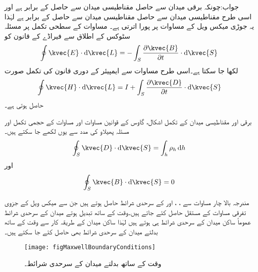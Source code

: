 جواب:چونکہ برقی میدان سے حاصل  مقناطیسی میدان سے حاصل  کے برابر ہے اور اسی طرح مقناطیسی میدان سے حاصل   مقناطیسی میدان سے حاصل  کے برابر ہے لہٰذا یہ جوڑی میکس ویل کے مساوات پر پورا اترتی ہے۔
 مساوات  کے سطحی تکمل پر مسئلہ سٹوکس کے اطلاق سے فیراڈے کے  قانون کو
\begin{align}\label{مساوات_میکس_ویل_تکمل_مساوات_الف}
\oint \kvec{E} \cdot \dif \kvec{L}=-\int_S \frac{\partial \kvec{B}}{\partial t} \cdot \dif \kvec{S}
\end{align}
لکھا جا سکتا ہے۔اسی طرح مساوات  سے ایمپیئر کے دوری قانون کی تکمل صورت
\begin{align}\label{مساوات_میکس_ویل_تکمل_مساوات_ب}
\oint \kvec{H} \cdot \dif \kvec{L}=I+\int_S \frac{\partial \kvec{D}}{\partial t} \cdot \dif \kvec{S}
\end{align}
حاصل ہوتی ہے۔

برقی اور مقناطیسی میدان کے تکمل اشکال، گاوس کے قوانین مساوات  اور مساوات  کے حجمی تکمل اور مسئلہ پھیلاو کی مدد سے یوں لکھے جا سکتے ہیں۔ 
\begin{align}\label{مساوات_میکس_ویل_تکمل_مساوات_پ}
\oint_S \kvec{D} \cdot \dif \kvec{S}=\int_h \rho_h \dif h
\end{align}
اور
\begin{align}\label{مساوات_میکس_ویل_تکمل_مساوات_ت}
\oint_S \kvec{B} \cdot \dif \kvec{S}=0
\end{align}

مندرجہ بالا چار مساوات سے ، ،  اور  کے سرحدی شرائط حاصل ہوتے ہیں جن سے میکس ویل کے جزوی تفرقی مساوات کے مستقل حاصل کئے جاتے ہیں۔وقت کے ساتھ تبدیل ہوتے میدان کے سرحدی شرائط عموماً ساکن میدان کے سرحدی شرائط ہی ہوتے ہیں لہٰذا ساکن میدان کے طریقہ کار سے وقت کے ساتھ بدلتے میدان کے سرحدی شرائط بھی حاصل کئے جا سکتے ہیں۔

\begin{figure}
\centering
\texttt{[image: figMaxwellBoundaryConditions]}
\caption{وقت کے ساتھ بدلتے میدان کے سرحدی شرائط۔}
\label{شکل_میکس_ویل_سرحدی_شرائط}
\end{figure}

